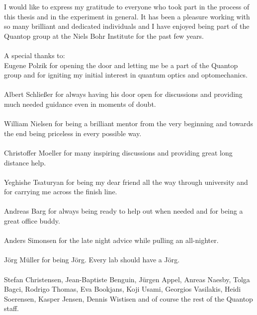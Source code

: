 I would like to express my gratitude to everyone who took part in the process of this thesis and in the experiment in general. It has been a pleasure working with so many brilliant and dedicated individuals and I have enjoyed being part of the Quantop group at the Niels Bohr Institute for the past few years.
\\
\\
\noindent
A special thanks to:
\\
\noindent
Eugene Polzik for opening the door and letting me be a part of the Quantop group and for igniting my initial interest in quantum optics and optomechanics.
\\
\\
\noindent
Albert Schlie{\ss}er for always having his door open for discussions and providing much needed guidance even in moments of doubt.
\\
\\
\noindent
William Nielsen for being a brilliant mentor from the very beginning and towards the end being priceless in every possible way.
\\
\\
\noindent
Christoffer Moeller for many inspiring discussions and providing great long distance help.
\\
\\
\noindent
Yeghishe Tsaturyan for being my dear friend all the way through university and for carrying me across the finish line.
\\
\\
\noindent
Andreas Barg for always being ready to help out when needed and for being a great office buddy.
\\
\\
\noindent
Anders Simonsen for the late night advice while pulling an all-nighter.
\\
\\
\noindent
Jörg Müller for being Jörg. Every lab should have a Jörg.
\\
\\
\noindent
Stefan Christensen, Jean-Baptiste Benguin, Jürgen Appel, Anreas Naesby, Tolga Bagci, Rodrigo Thomas, Eva Bookjans, Koji Usami, Georgios Vasilakis, Heidi Soerensen, Kasper Jensen, Dennis Wistisen and of course the rest of the Quantop staff.